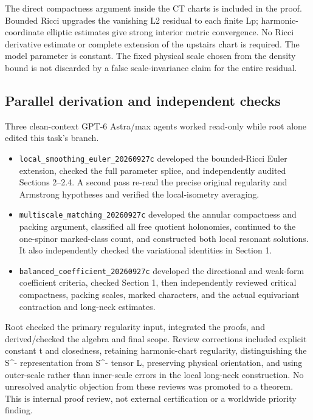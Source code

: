 \documentclass[
  10pt,
]{article}
\providecommand{\tightlist}{%
  \setlength{\itemsep}{0pt}\setlength{\parskip}{0pt}}
\begin{document}
The direct compactness argument inside the CT charts is included in the
proof. Bounded Ricci upgrades the vanishing L2 residual to each finite
Lp; harmonic-coordinate elliptic estimates give strong interior metric
convergence. No Ricci derivative estimate or complete extension of the
upstairs chart is required. The model parameter is constant. The fixed
physical scale chosen from the density bound is not discarded by a false
scale-invariance claim for the entire residual.

\hypertarget{parallel-derivation-and-independent-checks-2}{%
\subsection{Parallel derivation and independent
checks}\label{parallel-derivation-and-independent-checks-2}}

Three clean-context GPT-6 Astra/max agents worked read-only while root
alone edited this task's branch.

\begin{itemize}
\tightlist
\item
  \nolinkurl{local_smoothing_euler_20260927c} developed the
  bounded-Ricci Euler extension, checked the full parameter splice, and
  independently audited Sections 2--2.4. A second pass re-read the
  precise original regularity and Armstrong hypotheses and verified the
  local-isometry averaging.
\item
  \nolinkurl{multiscale_matching_20260927c} developed the annular
  compactness and packing argument, classified all free quotient
  holonomies, continued to the one-spinor marked-class count, and
  constructed both local resonant solutions. It also independently
  checked the variational identities in Section 1.
\item
  \nolinkurl{balanced_coefficient_20260927c} developed the directional
  and weak-form coefficient criteria, checked Section 1, then
  independently reviewed critical compactness, packing scales, marked
  characters, and the actual equivariant contraction and long-neck
  estimates.
\end{itemize}

Root checked the primary regularity input, integrated the proofs, and
derived/checked the algebra and final scope. Review corrections included
explicit constant t and closedness, retaining harmonic-chart regularity,
distinguishing the S\^{}- representation from S\^{}- tensor L,
preserving physical orientation, and using outer-scale rather than
inner-scale errors in the local long-neck construction. No unresolved
analytic objection from these reviews was promoted to a theorem. This is
internal proof review, not external certification or a worldwide
priority finding.
\end{document}
